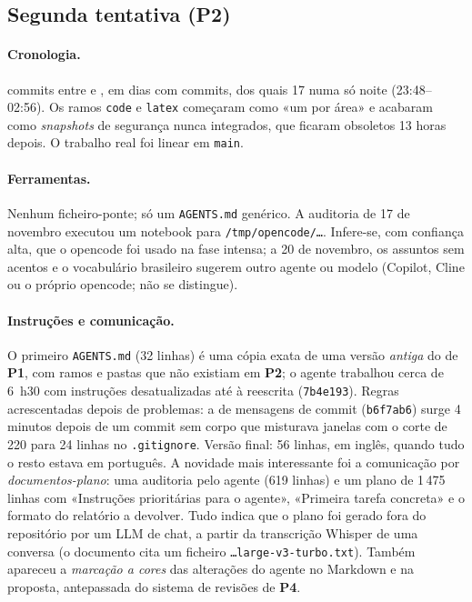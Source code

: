 \documentclass[11pt,a4paper]{article}
\newcommand{\Pum}{\textbf{P1}}
\newcommand{\Pdois}{\textbf{P2}}
\newcommand{\Pquatro}{\textbf{P4}}
\begin{document}
\subsection{Segunda tentativa (\Pdois)}

\paragraph{Cronologia.} \mDoisCommits{} commits entre \mDoisPrimeiro{} e
\mDoisUltimo{}, em \mDoisDias{} dias com commits, dos quais 17 numa só noite (23:48--02:56).
Os ramos \texttt{code} e \texttt{latex} começaram como «um por área» e acabaram como
\emph{snapshots} de segurança nunca integrados, que ficaram obsoletos 13 horas depois. O trabalho
real foi linear em \texttt{main}.

\paragraph{Ferramentas.} Nenhum ficheiro-ponte; só um \texttt{AGENTS.md} genérico. A
auditoria de 17 de novembro executou um notebook para \texttt{/tmp/opencode/\dots}.
Infere-se, com confiança alta, que o opencode foi usado na fase intensa; a 20 de novembro, os assuntos sem
acentos e o vocabulário brasileiro sugerem outro agente ou modelo (Copilot, Cline ou o próprio
opencode; não se distingue).

\paragraph{Instruções e comunicação.} O primeiro \texttt{AGENTS.md} (32 linhas) é uma
cópia exata de uma versão \emph{antiga} do de \Pum{}, com ramos e pastas que não existiam em
\Pdois; o agente trabalhou cerca de 6~h30 com instruções desatualizadas até à reescrita
(\texttt{7b4e193}). Regras acrescentadas depois de problemas: a de mensagens de commit
(\texttt{b6f7ab6}) surge 4 minutos depois de um commit sem corpo que misturava janelas com o
corte de 220 para 24 linhas no \texttt{.gitignore}. Versão final: 56 linhas, em inglês, quando
tudo o resto estava em português. A novidade mais interessante foi a comunicação por
\emph{documentos-plano}: uma auditoria pelo agente (619 linhas) e um plano de 1\,475 linhas com
«Instruções prioritárias para o agente», «Primeira tarefa concreta» e o formato do relatório a
devolver. Tudo indica que o plano foi gerado fora do repositório por um LLM de chat, a partir da
transcrição Whisper de uma conversa (o documento cita um ficheiro
\texttt{\dots large-v3-turbo.txt}). Também apareceu a \emph{marcação a cores} das alterações do
agente no Markdown e na proposta, antepassada do sistema de revisões de \Pquatro.
\end{document}

